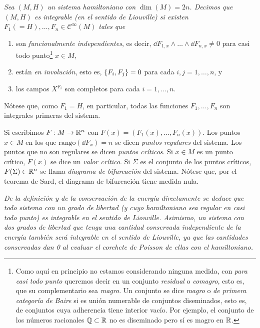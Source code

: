 \begin{defn}
  \em
  Sea $(M,H)$ un sistema hamiltoniano con $\dim(M)=2n$. Decimos que $(M,H)$ es \emph{integrable (en el sentido de Liouville)} si existen $F_1(=H),\dots,F_n\in \mathscr{C}^{\infty}(M)$ tales que
\begin{enumerate}
  \item son \emph{funcionalmente independientes}, es decir, $\dd F_{1,x}\wedge \dots \wedge \dd F_{n,x}\neq 0$ para casi todo punto\footnote{Como aquí en principio no estamos considerando ninguna medida, con \emph{para casi todo punto} queremos decir en un conjunto \emph{residual} o \emph{comagro}, esto es, que su complementario sea \emph{magro}. Un conjunto se dice \emph{magro} o \emph{de primera categoría de Baire} si es unión numerable de conjuntos diseminados, esto es, de conjuntos cuya adherencia tiene interior vacío. Por ejemplo, el conjunto de los números racionales $\mathbb{Q}\subset\mathbb{R}$ no es diseminado pero sí es magro en $\mathbb{R}$. } $x\in M$, 
  \item están \emph{en involución}, esto es, $\left\lbrace F_i,F_j\right\rbrace=0$ para cada $i,j=1,\dots,n$, y
  \item  los campos $X^{F_i}$ son completos para cada $i=1,\dots,n$. 
\end{enumerate}
Nótese que, como $F_1=H$, en particular, todas las funciones $F_1,\dots,F_n$ son integrales primeras del sistema.

Si escribimos $F:M\rightarrow \mathbb{R}^n$ con $F(x)=(F_1(x),\dots,F_n(x))$. Los puntos $x\in M$ en los que $\mathrm{rango} (\dd F_x) =n$ se dicen \emph{puntos regulares} del sistema. Los puntos que no son regulares se dicen \emph{puntos críticos}. Si $x\in M$ es un punto crítico, $F(x)$ se dice un \emph{valor crítico}. Si $\Sigma$ es el conjunto de los puntos críticos, $F(\Sigma)\in \mathbb{R}^n$ se llama \emph{diagrama de bifurcación} del sistema.
 Nótese que, por el teorema de Sard, el diagrama de bifurcación tiene medida nula.
\end{defn}

\begin{obs}
  \em
  De la definición y de la conservación de la energía directamente se deduce que todo sistema con un grado de libertad (y cuyo hamiltoniano sea regular en casi todo punto) es integrable en el sentido de Liouville. Asimismo, un sistema con dos grados de libertad que tenga una cantidad conservada independiente de la energía también será integrable en el sentido de Liouville, ya que las cantidades conservadas dan 0 al evaluar el corchete de Poisson de ellas con el hamiltoniano.
\end{obs}


